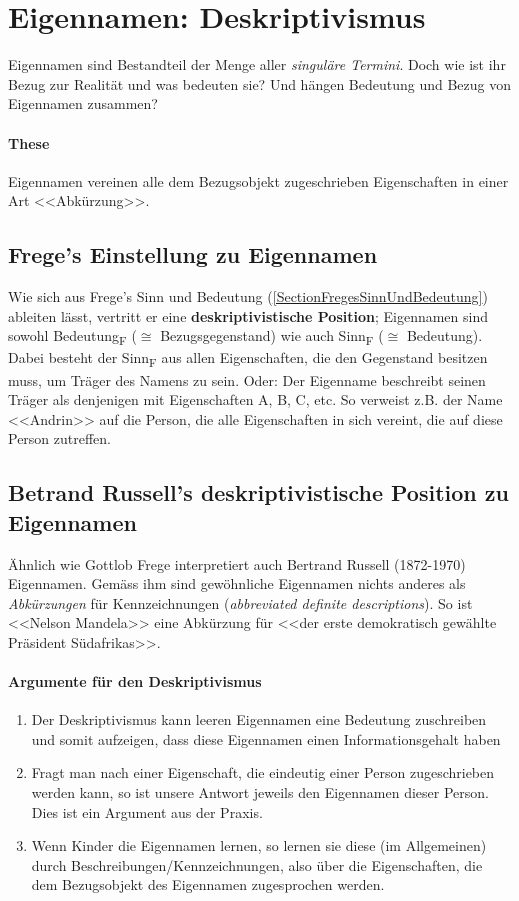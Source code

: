 \documentclass[../main.tex]{subfiles}
\begin{document}
\section{Eigennamen: Deskriptivismus}
Eigennamen sind Bestandteil der Menge aller \textit{singuläre Termini}. Doch wie ist ihr Bezug zur Realität und was bedeuten sie? Und hängen Bedeutung und Bezug von Eigennamen zusammen?

\paragraph{These} Eigennamen vereinen alle dem Bezugsobjekt zugeschrieben Eigenschaften in einer Art <<Abkürzung>>.

\subsection{Frege's Einstellung zu Eigennamen}
Wie sich aus Frege's Sinn und Bedeutung (\ref{SectionFregesSinnUndBedeutung}) ableiten lässt, vertritt er eine \textbf{deskriptivistische Position}; Eigennamen sind sowohl Bedeutung\textsubscript{F} ($\cong$ Bezugsgegenstand) wie auch Sinn\textsubscript{F} ($\cong$ Bedeutung). Dabei besteht der Sinn\textsubscript{F} aus allen Eigenschaften, die den Gegenstand besitzen muss, um Träger des Namens zu sein. Oder: Der Eigenname beschreibt seinen Träger als denjenigen mit Eigenschaften A, B, C, etc. So verweist z.B. der Name <<Andrin>> auf die Person, die alle Eigenschaften in sich vereint, die auf diese Person zutreffen. 

\subsection{Betrand Russell's deskriptivistische Position zu Eigennamen}
Ähnlich wie Gottlob Frege interpretiert auch Bertrand Russell (1872-1970) Eigennamen. Gemäss ihm sind gewöhnliche Eigennamen nichts anderes als \textit{Abkürzungen} für Kennzeichnungen (\textit{abbreviated definite descriptions}). So ist <<Nelson Mandela>> eine Abkürzung für <<der erste demokratisch gewählte Präsident Südafrikas>>. 

\paragraph{Argumente für den Deskriptivismus}
\begin{enumerate}
	\item Der Deskriptivismus kann leeren Eigennamen eine Bedeutung zuschreiben und somit aufzeigen, dass diese Eigennamen einen Informationsgehalt haben
	\item Fragt man nach einer Eigenschaft, die eindeutig einer Person zugeschrieben werden kann, so ist unsere Antwort jeweils den Eigennamen dieser Person. Dies ist ein Argument aus der Praxis. 
	\item Wenn Kinder die Eigennamen lernen, so lernen sie diese (im Allgemeinen) durch Beschreibungen/Kennzeichnungen, also über die Eigenschaften, die dem Bezugsobjekt des Eigennamen zugesprochen werden.
\end{enumerate}
\end{document}
